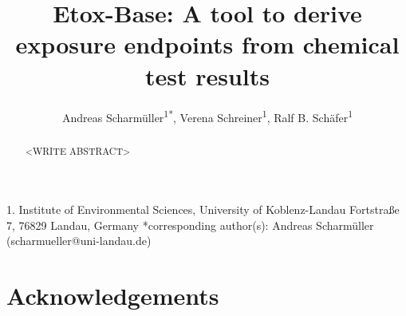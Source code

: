 \documentclass[english]{article}
\begin{document}
\title{Etox-Base: A tool to derive exposure endpoints from chemical test results}

\author{Andreas Scharm{\"u}ller\textsuperscript{1{*}},
        Verena Schreiner\textsuperscript{1},
        Ralf B. Sch{\"a}fer\textsuperscript{1}}

\maketitle
\thispagestyle{fancy}

1. Institute of Environmental Sciences, University of Koblenz-Landau Fortstraße 7, 76829 Landau, Germany {*}corresponding author(s):
Andreas Scharm{\"u}ller (scharmueller@uni-landau.de)

\begin{abstract}

<WRITE ABSTRACT>

\end{abstract}
\pagebreak


\pagebreak


\pagebreak


\pagebreak


\pagebreak




\section*{Acknowledgements}
\end{document}

